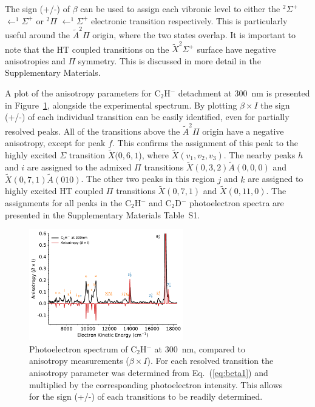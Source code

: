 \documentclass[journal=jpcafh,manuscript=article,layout=onecolumn, 12pt]{achemso}
\begin{document}
The sign (+/-) of $\beta$ can be used to assign each vibronic level to either the $^2\Sigma^+$ $\leftarrow^1\Sigma^+$ or $^2\Pi$ $\leftarrow^1\Sigma^+$ electronic transition respectively. This is particularly useful around the $\tilde{A} ^2\Pi$ origin, where the two states overlap. It is important to note that the HT coupled transitions on the $\tilde{X} ^2\Sigma^+$ surface have negative anisotropies and $\Pi$ symmetry. This is discussed in more detail in the Supplementary Materials.

A plot of the anisotropy parameters for C$_2$H$^-$ detachment at 300~nm is presented in Figure~\ref{fig:6}, alongside the experimental spectrum. By plotting $\beta\times I$ the sign (+/-) of each individual transition can be easily identified, even for partially resolved peaks. All of the transitions above the $\tilde{A} ^2\Pi$ origin have a negative anisotropy, except for peak $f$. This confirms the assignment of this peak to the highly excited $\Sigma$ transition $\tilde{X}(0,6,1$), where $\tilde{X}(v_1,v_2,v_3)$. The nearby peaks $h$ and $i$  are assigned to the admixed $\Pi$ transitions $\tilde{X}(0,3,2)\tilde{A}(0,0,0)$ and $\tilde{X}(0,7,1)\tilde{A}(010)$. The other two peaks in this region $j$ and $k$ are assigned to highly excited HT coupled $\Pi$ transitions $\tilde{X}(0,7,1)$ and $\tilde{X}(0,11,0)$. The assignments for all peaks in the C$_2$H$^-$ and C$_2$D$^-$ photoelectron spectra are presented in the Supplementary Materials Table~S1.

\begin{figure}[th!]
	\includegraphics[width=0.6\textwidth]{figures/plotBeta.pdf}
	\caption{Photoelectron spectrum of C$_2$H$^-$ at 300~nm, compared to anisotropy measurements ($\beta\times I$). For each resolved transition the anisotropy parameter was determined from Eq.~(\ref{eq:beta1}) and multiplied by the corresponding photoelectron intensity. This allows for the sign (+/-) of each transitions to be readily determined.}
	\label{fig:6}
\end{figure}
\end{document}
